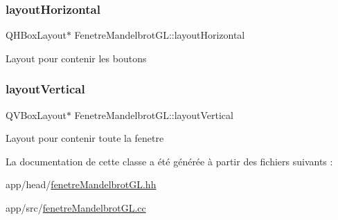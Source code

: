 \subsubsection{\texorpdfstring{layout\+Horizontal}{layoutHorizontal}}
{\footnotesize\ttfamily Q\+H\+Box\+Layout$\ast$ Fenetre\+Mandelbrot\+G\+L\+::layout\+Horizontal\hspace{0.3cm}{\ttfamily [private]}}

Layout pour contenir les boutons \mbox{\label{classFenetreMandelbrotGL_aa5fbba88a7419f44316213673c6ef138}} 
\subsubsection{\texorpdfstring{layout\+Vertical}{layoutVertical}}
{\footnotesize\ttfamily Q\+V\+Box\+Layout$\ast$ Fenetre\+Mandelbrot\+G\+L\+::layout\+Vertical\hspace{0.3cm}{\ttfamily [private]}}

Layout pour contenir toute la fenetre 

La documentation de cette classe a été générée à partir des fichiers suivants \+:\begin{DoxyCompactItemize}
\item 
app/head/\hyperlink{fenetreMandelbrotGL_8hh}{fenetre\+Mandelbrot\+G\+L.\+hh}\item 
app/src/\hyperlink{fenetreMandelbrotGL_8cc}{fenetre\+Mandelbrot\+G\+L.\+cc}\end{DoxyCompactItemize}
